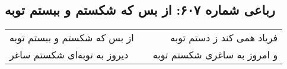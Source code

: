 \begin{center}
\section*{رباعی شماره ۶۰۷: از بس که شکستم و ببستم توبه}
\label{sec:sh607}
\begin{longtable}{l p{0.5cm} r}
از بس که شکستم و ببستم توبه
&&
فریاد همی کند ز دستم توبه
\\
دیروز به توبه‌ای شکستم ساغر
&&
و امروز به ساغری شکستم توبه
\\
\end{longtable}
\end{center}
